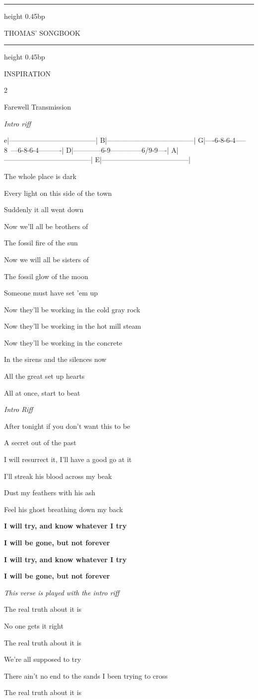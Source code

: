 \documentclass[10pt,twoside]{article}
\newlength{\songcolumnwidth}
\newcommand{\songbooktitle}{Thomas' Songbook}
\newcommand{\categorylabel}[1]{%
  {\categoryface\fontsize{17bp}{19bp}\selectfont\MakeUppercase{#1}}%
}
\newcommand{\category}[1]{%
  \par\noindent
  \parbox[c]{\songcolumnwidth}{%
    \centering
    \hrule height 0.45bp\vskip 2.5bp
    {\mastheadface\fontsize{10bp}{11bp}\selectfont\MakeUppercase{\songbooktitle}\par}%
    \vskip 2bp\hrule height 0.45bp
  }%
  \hfill
  \categorylabel{#1}%
  \par\vspace{11bp}%
}
\newcommand{\songtext}{\raggedright\fontsize{9bp}{9.15bp}\selectfont}
\newenvironment{songcolumns}
  {\begin{multicols*}{2}\songtext}
  {\end{multicols*}}
\newcommand{\songtitle}[1]{%
  \par\addvspace{9bp}%
  {\titleface\fontsize{14.5bp}{15bp}\selectfont #1\par}%
  \nobreak\vskip 2bp%
}
\newcommand{\lyric}[1]{%
  \hangindent=9bp\relax
  #1\par
}
\newenvironment{stanza}{\par\begingroup}{\par\endgroup\addvspace{4bp}}
\newcommand{\refrain}[1]{\lyric{\textbf{#1}}}
\newcommand{\chords}[1]{%
  \par\nobreak\vskip 2bp
  {\chordface\fontsize{10bp}{11bp}\selectfont\formatchords{#1}\par}%
  \addvspace{4bp}%
}
\newcommand{\playnote}[1]{%
  \par\addvspace{4bp}%
  {\sffamily\itshape\fontsize{7bp}{8bp}\selectfont #1\par}%
  \nobreak
}
\begin{document}
\clearpage

\category{Inspiration}

\begin{songcolumns}

\songtitle{Farewell Transmission}
\playnote{Intro riff}
\begin{songtab}
e|--------------------------------------|
B|--------------------------------------|
G|----6-8-6-4-----8~---6-8-6-4----------|
D|------------6-9--------------6/9-9----|
A|--------------------------------------|
E|--------------------------------------|
\end{songtab}
\chords{C\# - E - /B - - -}
\begin{stanza}
  \lyric{The whole place is dark}
  \lyric{Every light on this side of the town}
  \lyric{Suddenly it all went down}
  \lyric{Now we'll all be brothers of}
  \lyric{The fossil fire of the sun}
  \lyric{Now we will all be sisters of}
  \lyric{The fossil glow of the moon}
\end{stanza}
\begin{stanza}
  \lyric{Someone must have set 'em up}
  \lyric{Now they'll be working in the cold gray rock}
  \lyric{Now they'll be working in the hot mill steam}
  \lyric{Now they'll be working in the concrete}
  \lyric{In the sirens and the silences now}
  \lyric{All the great set up hearts}
  \lyric{All at once, start to beat}
\end{stanza}
\playnote{Intro Riff}
\begin{stanza}
  \lyric{After tonight if you don't want this to be}
  \lyric{A secret out of the past}
  \lyric{I will resurrect it, I'll have a good go at it}
  \lyric{I'll streak his blood across my beak}
  \lyric{Dust my feathers with his ash}
  \lyric{Feel his ghost breathing down my back}
\end{stanza}
\begin{stanza}
  \refrain{I will try, and know whatever I try}
  \refrain{I will be gone, but not forever}
  \refrain{I will try, and know whatever I try}
  \refrain{I will be gone, but not forever}
\end{stanza}
\playnote{This verse is played with the intro riff}
\begin{stanza}
  \lyric{The real truth about it is}
  \lyric{No one gets it right}
  \lyric{The real truth about it is}
  \lyric{We're all supposed to try}
\end{stanza}
\begin{stanza}
  \lyric{There ain't no end to the sands I been trying to cross}
  \lyric{The real truth about it is}

\end{stanza}
\end{songcolumns}
\end{document}
